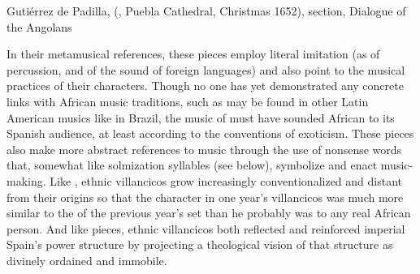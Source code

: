 
{Gutiérrez de Padilla,  
(, Puebla Cathedral, Christmas 1652), 
section, Dialogue of the Angolans}

In their metamusical references, these pieces employ literal
imitation (as of percussion, and of the  sound of foreign
languages) and also point to the musical practices of their characters.
Though no one has yet demonstrated any concrete links with African music
traditions, such as may be found in other Latin American musics like
 in Brazil, the music of  must have
sounded African to its Spanish audience, at least according to the conventions
of exoticism.%
    \Autocite{Kubik:AngolanTraits} %
These pieces also make more abstract references to music through the use of
nonsense words that, somewhat like solmization syllables (see below), symbolize
and enact music-making.
Like , ethnic villancicos grow increasingly conventionalized and
distant from their origins so that the  character in one year's
villancicos was much more similar to the  of the previous year's
set than he probably was to any real African person.
And like  pieces, ethnic villancicos both reflected and reinforced
imperial Spain's power structure by projecting a theological vision of that
structure as divinely ordained and immobile.

